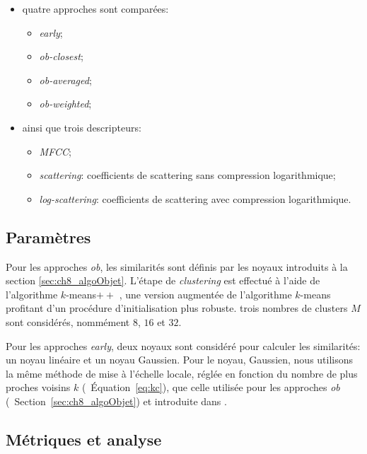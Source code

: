 \begin{itemize}

\item quatre approches sont comparées:

\begin{itemize}
\item \emph{early};
\item \emph{ob-closest};
\item \emph{ob-averaged};
\item \emph{ob-weighted};
\end{itemize}

\item ainsi que trois descripteurs:

\begin{itemize}
\item \emph{MFCC};
\item \emph{scattering}: coefficients de scattering sans compression logarithmique;
\item \emph{log-scattering}: coefficients de scattering avec compression logarithmique.
\end{itemize}
 
\end{itemize}

\subsection{Paramètres}

Pour les approches \emph{ob}, les similarités sont définis par les noyaux introduits à la section \ref{sec:ch8_algoObjet}. L'étape de \emph{clustering} est effectué à l'aide de l'algorithme $k$-means$++$ \citep{arthur2007k}, une version augmentée de l'algorithme $k$-means profitant d'un procédure d'initialisation plus robuste. trois nombres de clusters $M$ sont considérés, nommément $8$, $16$ et $32$.

Pour les approches \emph{early}, deux noyaux sont considéré pour calculer les similarités: un noyau linéaire et un noyau Gaussien. Pour le noyau, Gaussien, nous utilisons la même méthode de mise à l'échelle locale, réglée en fonction du nombre de plus proches voisins $k$ (\cf~Équation~\ref{eq:kc}), que celle utilisée pour les approches \emph{ob} (\cf~Section~\ref{sec:ch8_algoObjet}) et introduite dans \citep{selfTuneManor2004}.

\subsection{Métriques et analyse}
 
